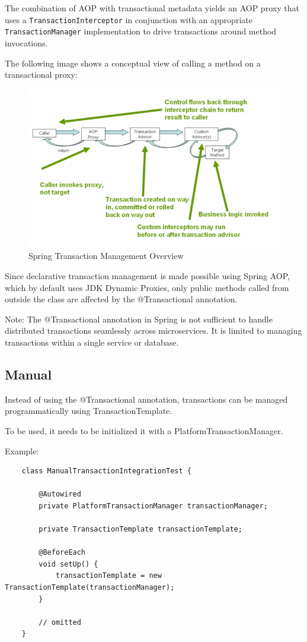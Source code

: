 \documentclass{scrartcl}
\begin{document}
The combination of AOP with transactional metadata yields an AOP proxy that uses a \lstinline|TransactionInterceptor| in conjunction with an appropriate \lstinline|TransactionManager| implementation to drive transactions around method invocations.

The following image shows a conceptual view of calling a method on a transactional proxy:

\begin{figure}[h]
    \centering
    \includegraphics[width=1\linewidth]{transactions-aop}
    \caption{Spring Transaction Management Overview}
    \label{fig:transactions-aop}
\end{figure}

Since declarative transaction management is made possible using Spring AOP, which by default uses JDK Dynamic Proxies, only public methods called from outside the class are affected by the @Transactional annotation.

Note: The @Transactional annotation in Spring is not sufficient to handle distributed transactions seamlessly across microservices. It is limited to managing transactions within a single service or database.


\subsection{Manual}

Instead of using the @Transactional annotation, transactions can be managed programmatically using TransactionTemplate.

To be used, it needs to be initialized it with a PlatformTransactionManager.

Example:

\begin{lstlisting}
    class ManualTransactionIntegrationTest {

        @Autowired
        private PlatformTransactionManager transactionManager;

        private TransactionTemplate transactionTemplate;

        @BeforeEach
        void setUp() {
            transactionTemplate = new TransactionTemplate(transactionManager);
        }

        // omitted
    }
\end{lstlisting}
\end{document}
